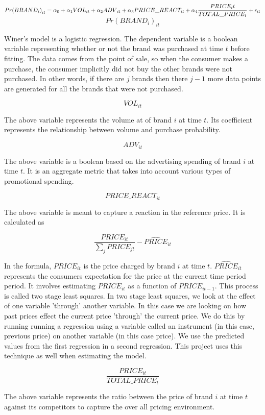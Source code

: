 \documentclass{article}
\begin{document}
$ {Pr(BRAND_i)}_{it} = \alpha_0 + \alpha_1 {VOL}_{it} + \alpha_2 {ADV}_{it} + \medskip  \alpha_3 PRICE\_REACT_{it}  + \alpha_4 \dfrac{PRICE_it}{TOTAL\_PRICE_{t}} + \epsilon_{it}$\\


$${Pr(BRAND_i)}_{it} $$

Winer's model is a logistic regression. The dependent variable is a boolean variable representing whether or not the brand was purchased at time $t$ before fitting. The data comes from the point of sale, so when the consumer makes a purchase, the consumer implicitly did not buy the other brands were not purchased. In other words, if there are $j$ brands then there $j-1$ more data points are generated for all the brands that were not purchased. 

$$VOL_{it}$$ 

The above variable represents the volume at of brand $i$ at time $t$. Its coefficient represents the relationship between volume and purchase probability.

$$ADV_{it}$$ 

The above variable is a boolean based on the advertising spending of brand $i$ at time $t$. It is an aggregate metric that takes into account various types of promotional spending.

$$PRICE\_REACT_{it}$$ 

The above variable is meant to capture a reaction in the reference price. It is calculated as

 $$\dfrac{PRICE_{it}} {\sum_j PRICE_{jt}} - \widehat{PRICE}_{it}$$ 

In the formula, ${PRICE}_{it}$ is the price charged by brand $i$ at time $t$. $\widehat{PRICE}_{it}$ represents the consumers expectation for the price at the current time period period. It involves estimating ${PRICE}_{it}$ as a function of ${PRICE}_{it-1}$. This process is called two stage least squares. In two stage least squares, we look at the effect of one variable 'through' another variable.  In this case we are looking on how past prices effect the current price 'through' the current price. We do this by running running a regression using a variable called an instrument (in this case, previous price) on another variable (in this case price). We use the predicted values from the first regression in a second regression. This project uses this technique as well when estimating the model.

$$ \dfrac{PRICE_{it}}{TOTAL\_PRICE_{t}}$$ 

The above variable represents the ratio between the price of brand $i$ at time $t$ against its competitors to capture the over all pricing environment.
\end{document}
